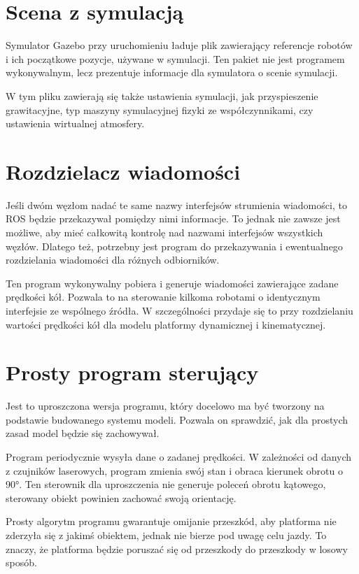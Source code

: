 \section{Scena z symulacją}
	Symulator Gazebo przy uruchomieniu ładuje plik zawierający referencje robotów i ich początkowe pozycje, używane w symulacji.
	Ten pakiet nie jest programem wykonywalnym, lecz prezentuje informacje dla symulatora o scenie symulacji.
	
	
	W tym pliku zawierają się także ustawienia symulacji, jak przyspieszenie grawitacyjne, typ maszyny symulacyjnej fizyki ze współczynnikami, czy ustawienia wirtualnej atmosfery.
	
\section{Rozdzielacz wiadomości}
	Jeśli dwóm węzłom nadać te same nazwy interfejsów strumienia wiadomości, to ROS będzie przekazywał pomiędzy nimi informacje.
	To jednak nie zawsze jest możliwe, aby mieć całkowitą kontrolę nad nazwami interfejsów wszystkich węzłów.
	Dlatego też, potrzebny jest program do przekazywania i ewentualnego rozdzielania wiadomości dla różnych odbiorników.
	
	Ten program wykonywalny pobiera i generuje wiadomości zawierające zadane prędkości kół.
	Pozwala to na sterowanie kilkoma robotami o identycznym interfejsie ze wspólnego źródła.
	W szczególności przydaje się to przy rozdzielaniu wartości prędkości kół dla modelu platformy dynamicznej i kinematycznej.
	
\section{Prosty program sterujący}
	Jest to uproszczona wersja programu, który docelowo ma być tworzony na podstawie budowanego systemu modeli.
	Pozwala on sprawdzić, jak dla prostych zasad model będzie się zachowywał.
	
	Program periodycznie wysyła dane o zadanej prędkości.
	W zależności od danych z czujników laserowych, program zmienia swój stan i obraca kierunek obrotu o \ang{90}.
	Ten sterownik dla uproszczenia nie generuje poleceń obrotu kątowego, sterowany obiekt powinien zachować swoją orientację.
	
	Prosty algorytm programu gwarantuje omijanie przeszkód, aby platforma nie zderzyła się z jakimś obiektem, jednak nie bierze pod uwagę celu jazdy.
	To znaczy, że platforma będzie poruszać się od przeszkody do przeszkody w losowy sposób.
	
